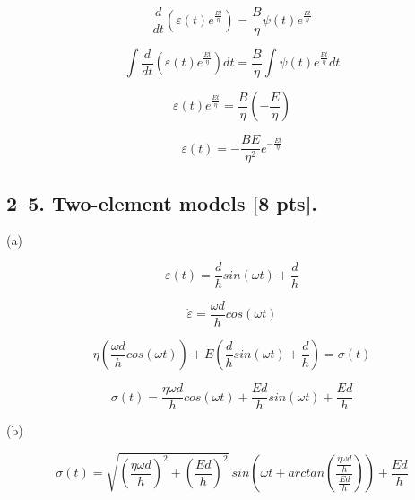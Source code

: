 \documentclass{article}
\begin{document}
\begin{equation*}
    \frac{d}{dt} (\varepsilon(t) e^\frac{Et}{\eta}) = \frac{B}{\eta} \psi(t) e^\frac{Et}{\eta}
\end{equation*}

\begin{equation*}
    \int \frac{d}{dt} (\varepsilon(t) e^\frac{Et}{\eta}) dt = \frac{B}{\eta} \int \psi(t) e^\frac{Et}{\eta} dt
\end{equation*}

\begin{equation*}
    \varepsilon(t) e^\frac{Et}{\eta} = \frac{B}{\eta} (-\frac{E}{\eta})
\end{equation*}

\begin{equation*}
    \varepsilon(t) = -\frac{BE}{\eta^2} e^{-\frac{Et}{\eta}}
\end{equation*}

\newpage


\subsection*{2--5. \textbf{Two-element models} [8 pts].}

(a)

\begin{equation*}
    \varepsilon(t) = \frac dh sin(\omega t) + \frac dh
\end{equation*}

\begin{equation*}
    \dot \varepsilon = \frac{\omega d}{h} cos(\omega t)
\end{equation*}

\begin{equation*}
    \eta (\frac{\omega d}{h} cos(\omega t)) + E (\frac dh sin(\omega t) + \frac dh) = \sigma(t)
\end{equation*}

\begin{equation*}
   \sigma(t) = \frac{\eta \omega d}{h} cos(\omega t) + \frac{Ed}{h} sin(\omega t) + \frac{Ed}{h}
\end{equation*}

\bigskip

(b)

\begin{equation*}
    \sigma(t) = \sqrt{(\frac{\eta \omega d}{h})^2 + (\frac{Ed}{h})^2} \ sin(\omega t + arctan(\frac{\frac{\eta \omega d}{h}}{\frac{Ed}{h}})) + \frac{Ed}{h}
\end{equation*}
\end{document}
